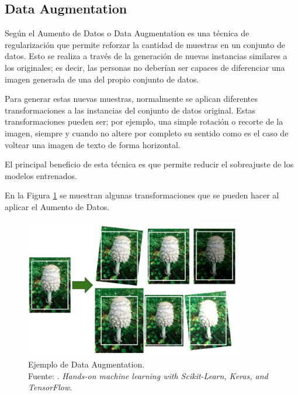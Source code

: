 \subsection{Data Augmentation}

Según \cite{bk_geron2022handml} el Aumento de Datos o Data Augmentation es una técnica de regularización que permite reforzar la cantidad de muestras en un conjunto de datos. Esto se realiza a través de la generación de nuevas instancias similares a los originales; es decir, las personas no deberían ser capaces de diferenciar una imagen generada de una del propio conjunto de datos.

Para generar estas nuevas muestras, normalmente se aplican diferentes transformaciones a las instancias del conjunto de datos original. Estas transformaciones pueden ser; por ejemplo, una simple rotación o recorte de la imagen, siempre y cuando no altere por completo su sentido como es el caso de voltear una imagen de texto de forma horizontal. 

El principal beneficio de esta técnica es que permite reducir el sobreajuste de los modelos entrenados. 

En la Figura \ref{2:fig212} se muestran algunas transformaciones que se pueden hacer al aplicar el Aumento de Datos. 

\begin{figure}[H]
	\begin{center}
		\includegraphics[width=0.85\textwidth]{2/figures/data_aug.PNG}
		\caption[Ejemplo de Data Augmentation]{Ejemplo de Data Augmentation. \\
		Fuente: \cite{bk_geron2022handml}. \textit{Hands-on machine learning with Scikit-Learn, Keras, and TensorFlow}.}
		\label{2:fig212}
	\end{center}
\end{figure}


